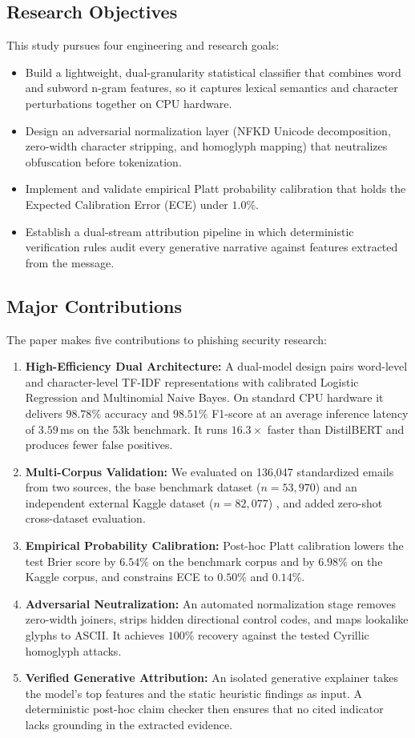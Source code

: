 \documentclass[conference]{IEEEtran}
\begin{document}
\subsection{Research Objectives}
This study pursues four engineering and research goals:
\begin{itemize}
    \item Build a lightweight, dual-granularity statistical classifier that combines word and subword n-gram features, so it captures lexical semantics and character perturbations together on CPU hardware.
    \item Design an adversarial normalization layer (NFKD Unicode decomposition, zero-width character stripping, and homoglyph mapping) that neutralizes obfuscation before tokenization.
    \item Implement and validate empirical Platt probability calibration that holds the Expected Calibration Error (ECE) under $1.0\%$.
    \item Establish a dual-stream attribution pipeline in which deterministic verification rules audit every generative narrative against features extracted from the message.
\end{itemize}

\subsection{Major Contributions}
The paper makes five contributions to phishing security research:
\begin{enumerate}
    \item \textbf{High-Efficiency Dual Architecture:} A dual-model design pairs word-level and character-level TF-IDF representations with calibrated Logistic Regression and Multinomial Naive Bayes. On standard CPU hardware it delivers $98.78\%$ accuracy and $98.51\%$ F1-score at an average inference latency of $3.59$\,ms on the 53k benchmark. It runs $16.3\times$ faster than DistilBERT and produces fewer false positives.
    \item \textbf{Multi-Corpus Validation:} We evaluated on 136,047 standardized emails from two sources, the base benchmark dataset ($n=53{,}970$) \cite{chakravorty2026} and an independent external Kaggle dataset ($n=82{,}077$) \cite{alsubaiey2024}, and added zero-shot cross-dataset evaluation.
    \item \textbf{Empirical Probability Calibration:} Post-hoc Platt calibration lowers the test Brier score by $6.54\%$ on the benchmark corpus and by $6.98\%$ on the Kaggle corpus, and constrains ECE to $0.50\%$ and $0.14\%$.
    \item \textbf{Adversarial Neutralization:} An automated normalization stage removes zero-width joiners, strips hidden directional control codes, and maps lookalike glyphs to ASCII. It achieves $100\%$ recovery against the tested Cyrillic homoglyph attacks.
    \item \textbf{Verified Generative Attribution:} An isolated generative explainer takes the model's top features and the static heuristic findings as input. A deterministic post-hoc claim checker then ensures that no cited indicator lacks grounding in the extracted evidence.
\end{enumerate}
\end{document}
